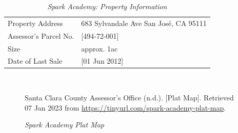 \begin{table}[htbp]
  \SingleSpacing%
  \caption[Spark Academy: Property Information]{\textit{Spark Academy: Property Information}}%
  \label{tab:spark-academy-prop-info}
  \begin{tabular}{ll}
    \toprule
    Property Address      & 683 Sylvandale Ave San José, CA 95111 \\
    Assessor's Parcel No. & [494-72-001] \\
    Size                  & approx. 1ac \\
    Date of Last Sale     & [01 Jun 2012]\\
    \bottomrule
  \end{tabular}\\
\end{table}

\begin{figure}[hbtp]
  \caption[Spark Academy Plat Map]{\textit{Spark Academy Plat Map}}%
  \label{fig:spark-academy-plat-map}
  {Santa Clara County Assessor's Office (n.d.). [Plat Map]. Retrieved 07 Jan 2023 from  \url{https://tinyurl.com/spark-academy-plat-map}.}
    
  \end{figure}

